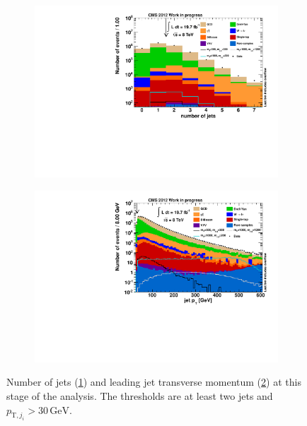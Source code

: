 \begin{figure}[htb!]
  \centering
  \begin{subfigure}[b]{0.495\textwidth}
    \centering
    \includegraphics[width=\textwidth]{plots/jet_n.pdf}
    \caption{\label{fig:jetn}}
  \end{subfigure}
  \begin{subfigure}[b]{0.495\textwidth}
    \centering
    \includegraphics[width=\textwidth]{plots/jet_pt1.pdf}
    \caption{\label{fig:jetpt1}}
  \end{subfigure}
  \caption{Number of jets (\ref{fig:jetn}) and leading jet transverse momentum (\ref{fig:jetpt1}) at this stage of the analysis. The thresholds are at least two jets and $p_{\text{T}, j_i} > 30\,\text{GeV}$.}
  \label{fig:jetqualy}
\end{figure}

